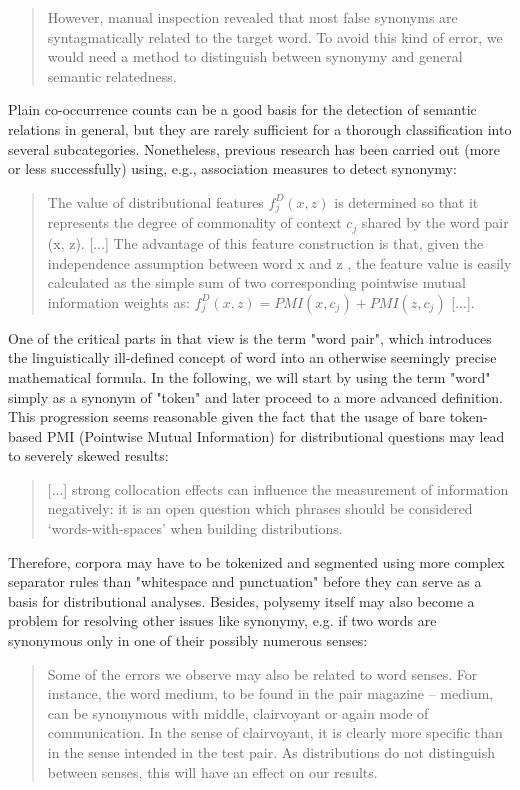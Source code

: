 \documentclass[jou]{apa6} %
\begin{document}
\blockquote[{\cite[p.~115]{karanDistributionalSemanticsApproach2012}}]{However, manual inspection revealed that most false synonyms are syntagmatically related to the target word. To avoid this kind of error, we would need a method to distinguish between synonymy and general semantic relatedness.}
Plain co-occurrence counts can be a good basis for the detection of semantic relations in general, but they are rarely sufficient for a thorough classification into several subcategories. Nonetheless, previous research has been carried out (more or less successfully) using, e.g., association measures to detect synonymy:
\blockquote[{\cite[p.~566]{hagiwaraSupervisedSynonymAcquisition2009}}]{The value of distributional features \( f_j^D (x, z) \) is determined so that it represents the degree of commonality of context \( c_j \) shared by the word pair (x, z). [...] The advantage of this feature construction is that, given the independence assumption between word x and z , the feature value is easily calculated as the simple sum of two corresponding pointwise mutual information weights as: \( f_j^D (x, z) = PMI(x, c_j) + PMI(z, c_j) \) [...].}
One of the critical parts in that view is the term "word pair", which introduces the linguistically ill-defined concept of word into an otherwise seemingly precise mathematical formula. In the following, we will start by using the term "word" simply as a synonym of "token" and later proceed to a more advanced definition. This progression seems reasonable given the fact that the usage of bare token-based PMI (Pointwise Mutual Information) for distributional questions may lead to severely skewed results:
\blockquote[{\cite[p.~444]{herbelotMeasuringSemanticContent2013}}]{[...] strong collocation effects can influence the measurement of information negatively: it is an open question which phrases should be considered ‘words-with-spaces’ when building distributions.}
Therefore, corpora may have to be tokenized and segmented using more complex separator rules than "whitespace and punctuation" before they can serve as a basis for distributional analyses. Besides, polysemy itself may also become a problem for resolving other issues like synonymy, e.g. if two words are synonymous only in one of their possibly numerous senses:
\blockquote[{\cite[p.~444]{herbelotMeasuringSemanticContent2013}}]{Some of the errors we observe may also be related to word senses. For instance, the word medium, to be found in the pair magazine – medium, can be synonymous with middle, clairvoyant or again mode of communication. In the sense of clairvoyant, it is clearly more specific than in the sense intended in the test pair. As distributions do not distinguish between senses, this will have an effect on our results.}
\end{document}
